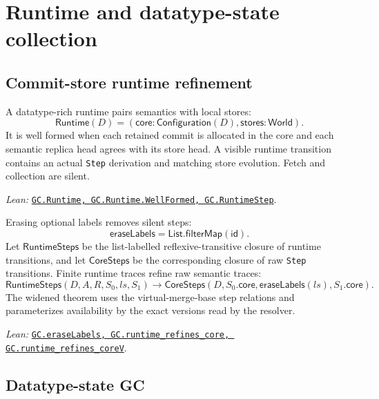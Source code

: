 \documentclass[11pt]{article}
\theoremstyle{definition}
\newcommand{\lean}[1]{\texttt{#1}}
\newcommand{\src}[2]{\href{../../#1}{\texttt{#2}}}
\newcommand{\anchor}[2]{\par\smallskip\noindent\emph{Lean: }\src{#1}{#2}.}
\begin{document}
\section{Runtime and datatype-state collection}
\label{sec:state-gc}

\subsection{Commit-store runtime refinement}

A datatype-rich runtime pairs semantics with local stores:
\[
 \mathsf{Runtime}(D)=
 (\mathsf{core}:\mathsf{Configuration}(D),
  \mathsf{stores}:\mathsf{World}).
\]
It is well formed when each retained commit is allocated in the core and each
semantic replica head agrees with its store head. A visible runtime transition
contains an actual \lean{Step} derivation and matching store evolution. Fetch
and collection are silent.
\anchor{Sal/MRDTs/GC/Refinement.lean}
  {GC.Runtime, GC.Runtime.WellFormed, GC.RuntimeStep}

Erasing optional labels removes silent steps:
\[
 \mathsf{eraseLabels}=\mathsf{List.filterMap}(\mathsf{id}).
\]
Let $\mathsf{RuntimeSteps}$ be the list-labelled reflexive-transitive closure
of runtime transitions, and let $\mathsf{CoreSteps}$ be the corresponding
closure of raw \lean{Step} transitions. Finite runtime traces refine raw
semantic traces:
\[
 \mathsf{RuntimeSteps}(D,A,R,S_0,ls,S_1)
 \to\mathsf{CoreSteps}
   (D,S_0.\mathsf{core},\mathsf{eraseLabels}(ls),S_1.\mathsf{core}).
\]
The widened theorem uses the virtual-merge-base step relations and parameterizes
availability by the exact versions read by the resolver.
\anchor{Sal/MRDTs/GC/Refinement.lean}
  {GC.eraseLabels, GC.runtime\_refines\_core, GC.runtime\_refines\_coreV}

\subsection{Datatype-state GC}
\end{document}
